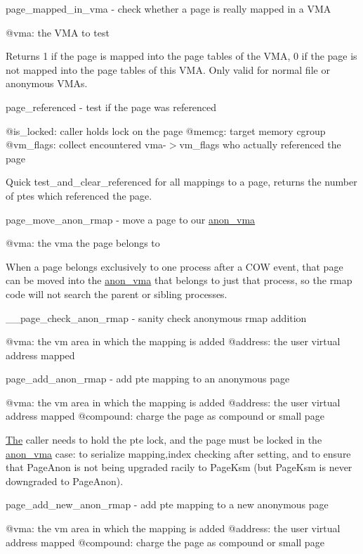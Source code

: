 page\+\_\+mapped\+\_\+in\+\_\+vma -\/ check whether a page is really mapped in a V\+MA

@vma\+: the V\+MA to test

Returns 1 if the page is mapped into the page tables of the V\+MA, 0 if the page is not mapped into the page tables of this V\+MA. Only valid for normal file or anonymous V\+M\+As.

page\+\_\+referenced -\/ test if the page was referenced

@is\+\_\+locked\+: caller holds lock on the page @memcg\+: target memory cgroup @vm\+\_\+flags\+: collect encountered vma-\/$>$vm\+\_\+flags who actually referenced the page

Quick test\+\_\+and\+\_\+clear\+\_\+referenced for all mappings to a page, returns the number of ptes which referenced the page.

page\+\_\+move\+\_\+anon\+\_\+rmap -\/ move a page to our \mbox{\hyperlink{structanon__vma}{anon\+\_\+vma}}

@vma\+: the vma the page belongs to

When a page belongs exclusively to one process after a C\+OW event, that page can be moved into the \mbox{\hyperlink{structanon__vma}{anon\+\_\+vma}} that belongs to just that process, so the rmap code will not search the parent or sibling processes.

\+\_\+\+\_\+page\+\_\+check\+\_\+anon\+\_\+rmap -\/ sanity check anonymous rmap addition

@vma\+: the vm area in which the mapping is added @address\+: the user virtual address mapped

page\+\_\+add\+\_\+anon\+\_\+rmap -\/ add pte mapping to an anonymous page

@vma\+: the vm area in which the mapping is added @address\+: the user virtual address mapped @compound\+: charge the page as compound or small page

\mbox{\hyperlink{classThe}{The}} caller needs to hold the pte lock, and the page must be locked in the \mbox{\hyperlink{structanon__vma}{anon\+\_\+vma}} case\+: to serialize mapping,index checking after setting, and to ensure that Page\+Anon is not being upgraded racily to Page\+Ksm (but Page\+Ksm is never downgraded to Page\+Anon).

page\+\_\+add\+\_\+new\+\_\+anon\+\_\+rmap -\/ add pte mapping to a new anonymous page

@vma\+: the vm area in which the mapping is added @address\+: the user virtual address mapped @compound\+: charge the page as compound or small page

